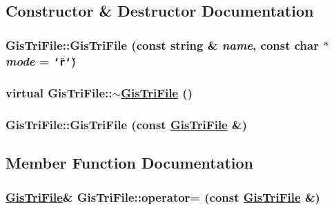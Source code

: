 \subsection{Constructor \& Destructor Documentation}
\hypertarget{classGisTriFile_a0}{
\subsubsection[GisTriFile]{\setlength{\rightskip}{0pt plus 5cm}Gis\-Tri\-File::Gis\-Tri\-File (const string \& {\em name}, const char $\ast$ {\em mode} = {\tt \char`\"{}r\char`\"{}})}}
\label{classGisTriFile_a0}


\hypertarget{classGisTriFile_a1}{
\subsubsection[$\sim$GisTriFile]{\setlength{\rightskip}{0pt plus 5cm}virtual Gis\-Tri\-File::$\sim$\hyperlink{classGisTriFile}{Gis\-Tri\-File} ()}}
\label{classGisTriFile_a1}


\hypertarget{classGisTriFile_d0}{
\subsubsection[GisTriFile]{\setlength{\rightskip}{0pt plus 5cm}Gis\-Tri\-File::Gis\-Tri\-File (const \hyperlink{classGisTriFile}{Gis\-Tri\-File} \&)}}
\label{classGisTriFile_d0}




\subsection{Member Function Documentation}
\hypertarget{classGisTriFile_d1}{
\subsubsection[operator=]{\setlength{\rightskip}{0pt plus 5cm}\hyperlink{classGisTriFile}{Gis\-Tri\-File}\& Gis\-Tri\-File::operator= (const \hyperlink{classGisTriFile}{Gis\-Tri\-File} \&)}}
\label{classGisTriFile_d1}


